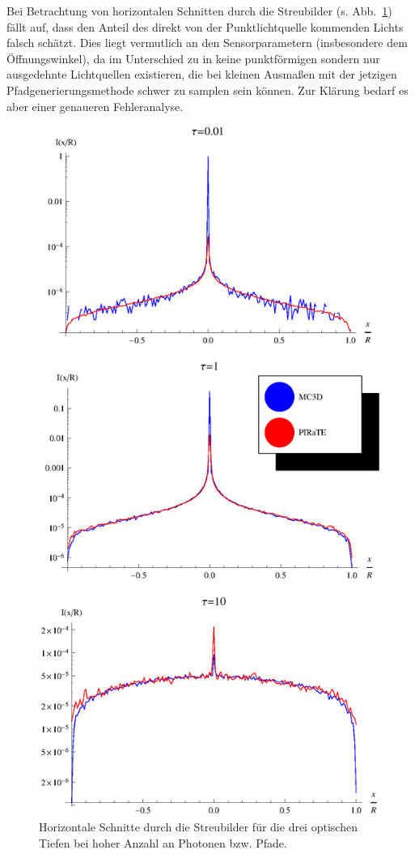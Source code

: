 	Bei Betrachtung von horizontalen Schnitten durch die Streubilder (s. Abb.~\ref{fig:sphere_image_cuts}) fällt auf, dass \pirate den Anteil des direkt von der Punktlichtquelle kommenden Lichts falsch schätzt. Dies liegt vermutlich an den Sensorparametern (insbesondere dem Öffnungswinkel), da im Unterschied zu \mctd in \pirate keine punktförmigen sondern nur ausgedehnte Lichtquellen existieren, die bei kleinen Ausmaßen mit der jetzigen Pfadgenerierungsmethode schwer zu samplen sein können. Zur Klärung bedarf es aber einer genaueren Fehleranalyse.
	
		\begin{figure}
			\centering
			\includegraphics[height=1.0\textheight]{sphere_image_cuts.eps}
			\caption{Horizontale Schnitte durch die Streubilder für die drei optischen Tiefen bei hoher Anzahl an Photonen bzw. Pfade.}
			\label{fig:sphere_image_cuts}
		\end{figure}
	
